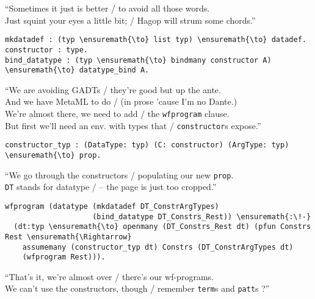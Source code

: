 \begin{versy}
``Sometimes it just is better / to avoid all those words. \\
Just squint your eyes a little bit; / Hagop will strum some chords.''
\end{versy}

\begin{verbatim}
mkdatadef : (typ \ensuremath{\to} list typ) \ensuremath{\to} datadef.
constructor : type.
bind_datatype : (typ \ensuremath{\to} bindmany constructor A) \ensuremath{\to} datatype_bind A.
\end{verbatim}

\begin{versy}
``We are avoiding GADTs / they're good but up the ante. \\
And we have MetaML to do / (in prose 'cause I'm no Dante.) \\
We're almost there, we need to add / the \texttt{wfprogram} clause. \\
But first we'll need an env. with types that / \texttt{constructor}s expose.''
\end{versy}

\begin{verbatim}
constructor_typ : (DataType: typ) (C: constructor) (ArgType: typ) \ensuremath{\to} prop.
\end{verbatim}

\begin{versy}
``We go through the constructors / populating our new \texttt{prop}. \\
\texttt{DT} stands for datatype / -- the page is just too cropped.''
\end{versy}

\importantCodeblock{}

\begin{verbatim}
wfprogram (datatype (mkdatadef DT_ConstrArgTypes)
                    (bind_datatype DT_Constrs_Rest)) \ensuremath{:\!-}
  (dt:typ \ensuremath{\to} openmany (DT_Constrs_Rest dt) (pfun Constrs Rest \ensuremath{\Rightarrow}
    assumemany (constructor_typ dt) Constrs (DT_ConstrArgTypes dt)
    (wfprogram Rest))).
\end{verbatim}

\importantCodeblockEnd{}

\begin{versy}
``That's it, we're almost over / there's our wf-programs. \\
We can't use the constructors, though / remember \texttt{term}s and \texttt{patt}s ?''
\end{versy}

